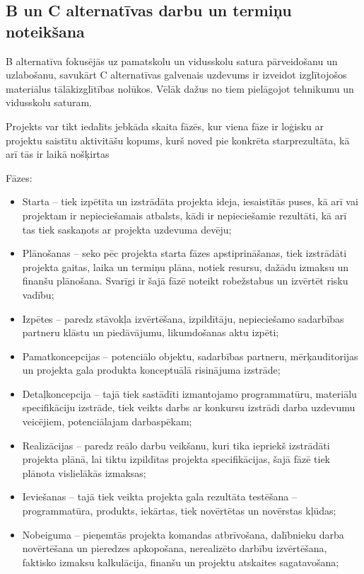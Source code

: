 \subsection{B un C alternatīvas darbu un termiņu noteikšana}
B alternatīva fokusējās uz pamatskolu un vidusskolu satura pārveidošanu un uzlabošanu, savukārt C alternatīvas
galvenais uzdevums ir izveidot izglītojošos materiālus tālākizglītības nolūkos. Vēlāk dažus no tiem pielāgojot
tehnikumu un vidusskolu saturam.
\par
Projekts var tikt iedalīts jebkāda skaita fāzēs, kur viena fāze ir
loģisku ar projektu saistītu aktivitāšu kopums, kurš noved pie konkrēta starprezultāta, kā arī tās ir
laikā nošķirtas\cite{zane_11} %
\par
Fāzes:
\begin{itemize}
    \item Starta – tiek izpētīta un izstrādāta projekta ideja, iesaistītās puses, kā arī vai projektam ir
    nepieciešamais atbalsts, kādi ir nepieciešamie rezultāti, kā arī tas tiek saskaņots ar projekta
    uzdevuma devēju;
    \item Plānošanas – seko pēc projekta starta fāzes apstiprināšanas, tiek izstrādāti projekta
    gaitas, laika un termiņu plāna, notiek resursu, dažādu izmaksu un finanšu plānošana. Svarīgi
    ir šajā fāzē noteikt robežstabus un izvērtēt risku vadību;
    \item Izpētes – paredz stāvokļa izvērtēšana, izpildītāju, nepieciešamo sadarbības partneru
    klāstu un piedāvājumu, likumdošanas aktu izpēti;
    \item Pamatkoncepcijas – potenciālo objektu, sadarbības partneru, mērķauditorijas un
    projekta gala produkta konceptuālā risinājuma izstrāde;
    \item Detaļkoncepcija – tajā tiek sastādīti izmantojamo programmatūru, materiālu specifikāciju
    izstrāde, tiek veikts darbs ar konkursu izstrādi darba uzdevumu veicējiem, potenciālajam
    darbaspēkam;
    \item Realizācijas – paredz reālo darbu veikšanu, kuri tika iepriekš izstrādāti projekta
    plānā, lai tiktu izpildītas projekta specifikācijas, šajā fāzē tiek plānota vislielākās izmaksas;
    \item Ieviešanas – tajā tiek veikta projekta gala rezultāta testēšana – programmatūra,
    produkts, iekārtas, tiek novērtētas un novērstas kļūdas;
    \item Nobeiguma – pieņemtās projekta komandas atbrīvošana, dalībnieku darba novērtēšana
    un pieredzes apkopošana, nerealizēto darbību izvērtēšana, faktisko izmaksu kalkulācija,
    finanšu un projektu atskaites sagatavošana;
\end{itemize}
